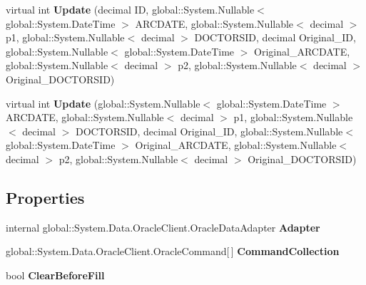 \begin{CompactItemize}
\item 
virtual int \textbf{Update} (decimal ID, global::System.Nullable$<$ global::System.DateTime $>$ ARCDATE, global::System.Nullable$<$ decimal $>$ p1, global::System.Nullable$<$ decimal $>$ DOCTORSID, decimal Original\_\-ID, global::System.Nullable$<$ global::System.DateTime $>$ Original\_\-ARCDATE, global::System.Nullable$<$ decimal $>$ p2, global::System.Nullable$<$ decimal $>$ Original\_\-DOCTORSID)\label{class_automatic_medical_system_1_1_data_set1_table_adapters_1_1_a_r_c___s_p___d_o_c_t_o_r___r_e_c_o_r_d_s_table_adapter_5f59ea30744df682b9e006084c1d5179}

\item 
virtual int \textbf{Update} (global::System.Nullable$<$ global::System.DateTime $>$ ARCDATE, global::System.Nullable$<$ decimal $>$ p1, global::System.Nullable$<$ decimal $>$ DOCTORSID, decimal Original\_\-ID, global::System.Nullable$<$ global::System.DateTime $>$ Original\_\-ARCDATE, global::System.Nullable$<$ decimal $>$ p2, global::System.Nullable$<$ decimal $>$ Original\_\-DOCTORSID)\label{class_automatic_medical_system_1_1_data_set1_table_adapters_1_1_a_r_c___s_p___d_o_c_t_o_r___r_e_c_o_r_d_s_table_adapter_b8409661abb16319acbe3b26ac38ed63}

\end{CompactItemize}
\subsection*{Properties}
\begin{CompactItemize}
\item 
internal global::System.Data.OracleClient.OracleDataAdapter \textbf{Adapter}\hspace{0.3cm}{\tt  [get]}\label{class_automatic_medical_system_1_1_data_set1_table_adapters_1_1_a_r_c___s_p___d_o_c_t_o_r___r_e_c_o_r_d_s_table_adapter_9b87cc9f25d8080501146fc7c1867e34}

\item 
global::System.Data.OracleClient.OracleCommand[$\,$] \textbf{CommandCollection}\hspace{0.3cm}{\tt  [get]}\label{class_automatic_medical_system_1_1_data_set1_table_adapters_1_1_a_r_c___s_p___d_o_c_t_o_r___r_e_c_o_r_d_s_table_adapter_5f16c6731759ba928766497c62f92852}

\item 
bool \textbf{ClearBeforeFill}\hspace{0.3cm}{\tt  [get, set]}\label{class_automatic_medical_system_1_1_data_set1_table_adapters_1_1_a_r_c___s_p___d_o_c_t_o_r___r_e_c_o_r_d_s_table_adapter_f1dc6c94f26f7df84d0bb81a6cd3379c}

\end{CompactItemize}


